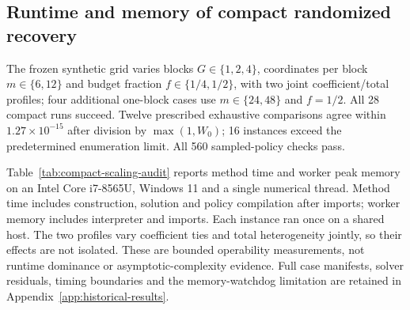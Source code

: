 \documentclass[12pt]{article}
\begin{document}
\subsection{Runtime and memory of compact randomized recovery}
The frozen synthetic grid varies blocks $G\in\{1,2,4\}$, coordinates per
block $m\in\{6,12\}$ and budget fraction $f\in\{1/4,1/2\}$, with two
joint coefficient/total profiles; four additional one-block cases use
$m\in\{24,48\}$ and $f=1/2$. All 28 compact runs succeed. Twelve prescribed
exhaustive comparisons agree within $1.27\times10^{-15}$ after division by
$\max(1,W_0)$; 16 instances exceed the predetermined enumeration limit.
All 560 sampled-policy checks pass.

Table~\ref{tab:compact-scaling-audit} reports method time and worker peak
memory on an Intel Core i7-8565U, Windows 11 and a single numerical thread.
Method time includes construction, solution and policy compilation after
imports; worker memory includes interpreter and imports. Each instance ran
once on a shared host. The two profiles vary coefficient ties and total
heterogeneity jointly, so their effects are not isolated. These are bounded
operability measurements, not runtime dominance or asymptotic-complexity
evidence. Full case manifests, solver residuals, timing boundaries and the
memory-watchdog limitation are retained in
Appendix~\ref{app:historical-results}.
\end{document}
